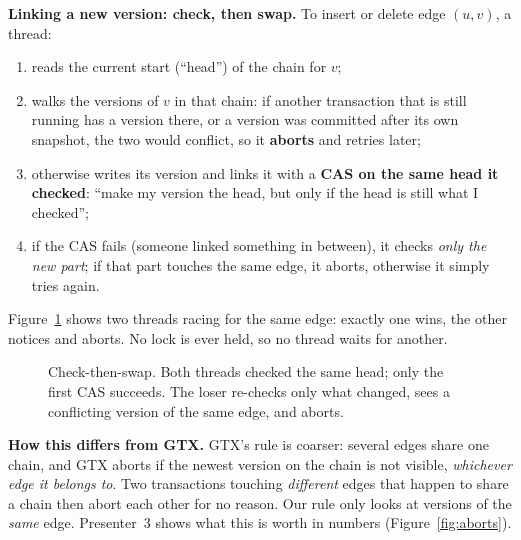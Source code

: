 \documentclass[11pt,a4paper]{article}
\begin{document}
\textbf{Linking a new version: check, then swap.}
To insert or delete edge $(u,v)$, a thread:
\begin{enumerate}
\item reads the current start (``head'') of the chain for $v$;
\item walks the versions of $v$ in that chain: if another transaction that is still running has a version there, or a
  version was committed after its own snapshot, the two would conflict, so it \textbf{aborts} and retries later;
\item otherwise writes its version and links it with a \textbf{CAS on the same head it checked}: ``make my version the
  head, but only if the head is still what I checked'';
\item if the CAS fails (someone linked something in between), it checks \emph{only the new part}; if that part touches
  the same edge, it aborts, otherwise it simply tries again.
\end{enumerate}
Figure~\ref{fig:cas} shows two threads racing for the same edge: exactly one wins, the other notices and aborts. No
lock is ever held, so no thread waits for another.

\begin{figure}[H]
\centering
{}
\caption{Check-then-swap. Both threads checked the same head; only the first CAS succeeds. The loser re-checks only
what changed, sees a conflicting version of the same edge, and aborts.}
\label{fig:cas}
\end{figure}

\textbf{How this differs from GTX.} GTX's rule is coarser: several edges share one chain, and GTX aborts if the newest
version on the chain is not visible, \emph{whichever edge it belongs to}. Two transactions touching \emph{different}
edges that happen to share a chain then abort each other for no reason. Our rule only looks at versions of the
\emph{same} edge. Presenter~3 shows what this is worth in numbers (Figure~\ref{fig:aborts}).
\end{document}
